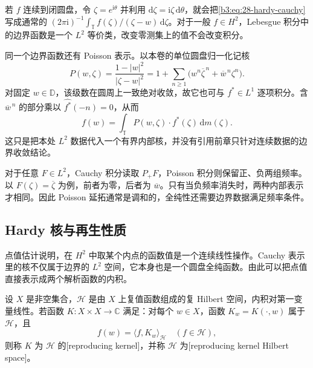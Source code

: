 若 \(f\) 连续到闭圆盘，令 \(\zeta=e^{\mathrm i\theta}\) 并利用 \(\mathrm d\zeta=\mathrm i\zeta\,\mathrm d\theta\)，就会把\eqref{b3:eq:28-hardy-cauchy}写成通常的 \((2\pi\mathrm i)^{-1}\int_{\mathbb T}f(\zeta)/(\zeta-w)\,\mathrm d\zeta\)。对于一般 \(f\in H^2\)，Lebesgue 积分中的边界函数是一个 \(L^2\) 等价类，改变零测集上的值不会改变积分。

\ProseParagraphBreak
同一个边界函数还有 Poisson 表示。以本卷的单位圆盘归一化记核
\[
 P(w,\zeta)=\frac{1-|w|^2}{|\zeta-w|^2}
 =1+\sum_{n\ge1}\bigl(w^n\overline\zeta^{\,n}
                     +\overline w^{\,n}\zeta^n\bigr).
\]
对固定 \(w\in\mathbb D\)，该级数在圆周上一致绝对收敛，故它也可与 \(f^*\in L^1\) 逐项积分。含 \(\overline w^{\,n}\) 的部分乘以 \(\widehat{f^*}(-n)=0\)，从而
\begin{equation}\label{b3:eq:28-hardy-poisson}
 f(w)=\int_{\mathbb T}P(w,\zeta)\cdot f^*(\zeta)\,\mathrm dm(\zeta).
\end{equation}
这只是把本处 \(L^2\) 数据代入一个有界内部核，并没有引用前章只针对连续数据的边界收敛结论。

\ProseParagraphBreak
对于任意 \(F\in L^2\)，Cauchy 积分读取 \(P_+F\)，Poisson 积分则保留正、负两组频率。以 \(F(\zeta)=\overline\zeta\) 为例，前者为零，后者为 \(\overline w\)。只有当负频率消失时，两种内部表示才相同。因此 Poisson 延拓通常是调和的，全纯性还需要边界数据满足频率条件。

\subsection{Hardy 核与再生性质}
\label{b3:subsec:280204}

点值估计说明，在 \(H^2\) 中取某个内点的函数值是一个连续线性操作。Cauchy 表示里的核不仅属于边界的 \(L^2\) 空间，它本身也是一个圆盘全纯函数。由此可以把点值直接表示成两个解析函数的内积。

\begin{definition}[再生核]\label{b3:def:28-reproducing-kernel}
设 \(X\) 是非空集合，\(\mathcal H\) 是由 \(X\) 上复值函数组成的复 Hilbert 空间，内积对第一变量线性。若函数 \(K:X\times X\to\mathbb C\) 满足：对每个 \(w\in X\)，函数 \(K_w=K(\cdot,w)\) 属于 \(\mathcal H\)，且
\[
 f(w)=\langle f,K_w\rangle_{\mathcal H}
 \quad(f\in\mathcal H),
\]
则称 \(K\) 为 \(\mathcal H\) 的[reproducing kernel]，并称 \(\mathcal H\) 为[reproducing kernel Hilbert space]。
\end{definition}

